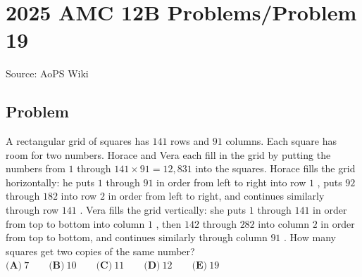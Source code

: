 \documentclass[12pt]{article}
\begin{document}
\section*{{2025 AMC 12B Problems/Problem 19}}
Source: AoPS Wiki

\subsection*{Problem}
A rectangular grid of squares has $141$ rows and $91$ columns. Each square has room for two numbers. Horace and Vera each fill in the grid by putting the numbers from $1$ through $141 \times 91 = 12{,}831$ into the squares. Horace fills the grid horizontally: he puts $1$ through $91$ in order from left to right into row $1$ , puts $92$ through $182$ into row $2$ in order from left to right, and continues similarly through row $141$ . Vera fills the grid vertically: she puts $1$ through $141$ in order from top to bottom into column $1$ , then $142$ through $282$ into column $2$ in order from top to bottom, and continues similarly through column $91$ . How many squares get two copies of the same number? $\textbf{(A)}~7 \qquad \textbf{(B)}~10 \qquad \textbf{(C)}~11 \qquad \textbf{(D)}~12 \qquad \textbf{(E)}~19$
\end{document}
